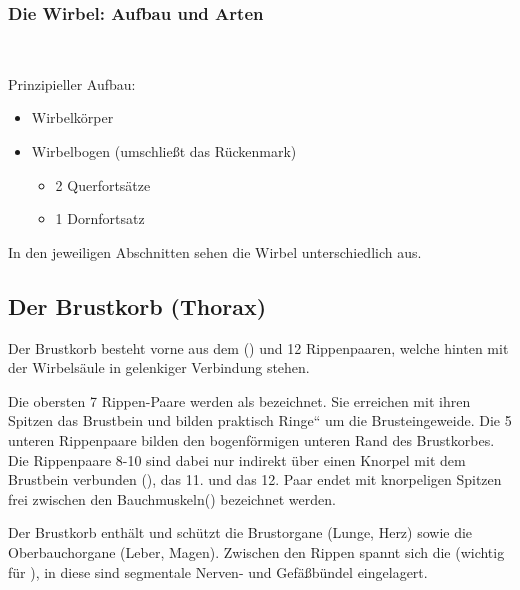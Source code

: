 \subsubsection{Die Wirbel: Aufbau und Arten}~

Prinzipieller Aufbau:

\begin{itemize}
\item Wirbelk\"orper
\item Wirbelbogen  (umschlie{\ss}t das R\"uckenmark)
\begin{itemize}
\item 2 Querforts\"atze
\item 1 Dornfortsatz
\end{itemize}
\end{itemize}


In den jeweiligen Abschnitten sehen die Wirbel
unterschiedlich aus.



\subsection{Der Brustkorb
(Thorax)}

Der  Brustkorb besteht vorne aus dem 
() und 12 Rippenpaaren, welche hinten mit der
Wirbels\"aule in gelenkiger Verbindung stehen. 

Die obersten 7 Rippen-Paare werden als 
{\quotedblbase}
bezeichnet. Sie erreichen mit ihren Spitzen das Brustbein und bilden praktisch
{\quotedblbase}Ringe{\textquotedblleft} um die Brusteingeweide. Die 5
unteren Rippenpaare bilden den bogenf\"ormigen unteren Rand des
Brustkorbes. Die Rippenpaare 8-10 sind dabei nur indirekt
\"uber einen Knorpel mit dem Brustbein verbunden
({\quotedblbase}), das
11. und das 12. Paar endet mit knorpeligen Spitzen frei zwischen den
Bauchmuskeln({\quotedblbase}) bezeichnet werden.

Der Brustkorb enth\"alt und sch\"utzt die Brust\-organe (Lunge, Herz)
sowie die Oberbauchorgane (Leber, Magen). Zwischen den
Rippen spannt sich die 
(wichtig f\"ur ), in diese sind segmentale
Nerven- und Gef\"a{\ss}b\"undel eingelagert.


